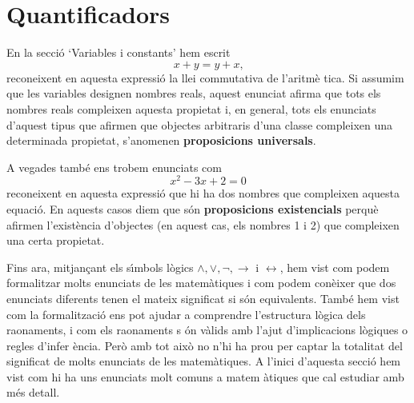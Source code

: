 \section{Quantificadors}

En la secci\'{o} `Variables i constants' hem escrit
\begin{equation*}
x+y=y+x\text{,}
\end{equation*}
reconeixent en aquesta expressi\'{o} la llei commutativa de l'aritm\`{e}%
tica. Si assumim que les variables designen nombres reals, aquest enunciat
afirma que tots els nombres reals compleixen aquesta propietat i, en
general, tots els enunciats d'aquest tipus que afirmen que objectes
arbitraris d'una classe compleixen una determinada propietat, s'anomenen
\textbf{proposicions universals}.

A vegades tamb\'{e} ens trobem enunciats com%
\begin{equation*}
x^{2}-3x+2=0
\end{equation*}
reconeixent en aquesta expressi\'{o} que hi ha dos nombres que compleixen
aquesta equaci\'{o}. En aquests casos diem que s\'{o}n \textbf{proposicions
existencials} perqu\`{e} afirmen l'exist\`{e}ncia d'objectes (en aquest cas,
els nombres 1 i 2) que compleixen una certa propietat.

\bigskip

Fins ara, mitjan\c{c}ant els s\'{\i}mbols l\`{o}gics $\wedge,\vee
,\lnot,\longrightarrow$ i $\longleftrightarrow$, hem vist com podem
formalitzar molts enunciats de les matem\`{a}tiques i com podem con\`{e}ixer
que dos enunciats diferents tenen el mateix significat si s\'{o}n
equivalents. Tamb\'{e} hem vist com la formalitzaci\'{o} ens pot ajudar a
comprendre l'estructura l\`{o}gica dels raonaments, i com els raonaments s%
\'{o}n v\`{a}lids amb l'ajut d'implicacions l\`{o}giques o regles d'infer%
\`{e}ncia. Per\`{o} amb tot aix\`{o} no n'hi ha prou per captar la totalitat
del significat de molts enunciats de les matem\`{a}tiques. A l'inici
d'aquesta secci\'{o} hem vist com hi ha uns enunciats molt comuns a matem%
\`{a}tiques que cal estudiar amb m\'{e}s detall.

\bigskip

